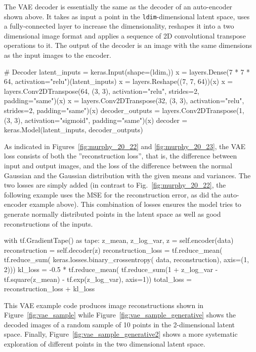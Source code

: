 The VAE decoder is essentially the same as the decoder of an auto-encoder shown above. It takes as input a point in the \texttt{ldim}-dimensional latent space, uses a fully-connected layer to increase the dimensionality, reshapes it into a two dimensional image format and applies a sequence of 2D convolutional transpose operations to it. The output of the decoder is an image with the same dimensions as the input images to the encoder.

\begin{pythoncode}
# Decoder
latent_inputs = keras.Input(shape=(ldim,))
x = layers.Dense(7 * 7 * 64, activation="relu")(latent_inputs)
x = layers.Reshape((7, 7, 64))(x)
x = layers.Conv2DTranspose(64, (3, 3), activation="relu", 
             strides=2, padding="same")(x)
x = layers.Conv2DTranspose(32, (3, 3), activation="relu", 
             strides=2, padding="same")(x)
decoder_outputs = layers.Conv2DTranspose(1, (3, 3), 
             activation="sigmoid", padding="same")(x)
decoder = keras.Model(latent_inputs, decoder_outputs)
\end{pythoncode}

As indicated in Figures~\ref{fig:murphy_20_22} and \ref{fig:murphy_20_23}, the VAE loss consists of both the ''reconstruction loss'', that is, the difference between input and output images, and the loss of the difference between the normal Gaussian and the Gaussian distribution with the given means and variances. The two losses are simply added (in contrast to Fig.~\ref{fig:murphy_20_22}, the following example uses the MSE for the reconstruction error, as did the auto-encoder example above). This combination of losses ensures the model tries to generate normally distributed points in the latent space as well as good reconstructions of the inputs.

\begin{pythoncode}
with tf.GradientTape() as tape:
    z_mean, z_log_var, z = self.encoder(data)
    reconstruction = self.decoder(z)
    reconstruction_loss = tf.reduce_mean(
        tf.reduce_sum(
            keras.losses.binary_crossentropy(
                data, reconstruction), axis=(1, 2)))
	kl_loss = -0.5 * tf.reduce_mean(
	    tf.reduce_sum(1 + z_log_var - tf.square(z_mean) 
                      - tf.exp(z_log_var), axis=1))
    total_loss = reconstruction_loss + kl_loss
\end{pythoncode}

This VAE example code produces image reconstructions shown in Figure~\ref{fig:vae_sample} while Figure~\ref{fig:vae_sample_generative} shows the decoded images of a random sample of 10 points in the 2-dimensional latent space. Finally, Figure~\ref{fig:vae_sample_generative2} shows a more systematic exploration of different points in the two dimensional latent space. 

